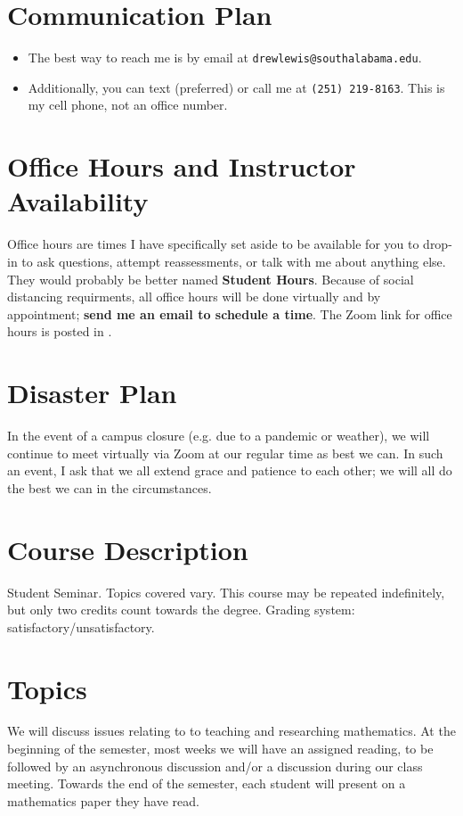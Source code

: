 \documentclass{article}
\begin{document}
\section*{\fontsize{12}{15}\selectfont Communication Plan}

\begin{itemize}
\item The best way to reach me is by email at {\tt drewlewis@southalabama.edu}. 
\item Additionally, you can text (preferred) or call me at {\tt(251) 219-8163}. This is my cell phone, not an office number.
\end{itemize}

\section*{\fontsize{12}{15}\selectfont Office Hours and Instructor Availability}

Office hours are times I have specifically set aside to be available for you to drop-in to ask questions, attempt reassessments, or talk with me about anything else. They would probably be better named \textbf{Student Hours}. Because of social distancing requirments, all office hours will be done virtually and by appointment; {\bf send me an email to schedule a time}. The Zoom link for office hours is posted in \LMS.

\section*{\fontsize{12}{15}\selectfont Disaster Plan}
In the event of a campus closure (e.g. due to a pandemic or weather), we will continue to meet virtually via Zoom at our regular time as best we can. In such an event, I ask that we all extend grace and patience to each other; we will all do the best we can in the circumstances.


\section*{\fontsize{12}{15}\selectfont Course Description}
Student Seminar. Topics covered vary. This course may be repeated indefinitely, but only two credits count towards the degree. Grading system: satisfactory/unsatisfactory.


\section*{\fontsize{12}{15}\selectfont Topics}
We will discuss issues relating to to teaching and researching mathematics. At the beginning of the semester, most weeks we will have an assigned reading, to be followed by an asynchronous discussion and/or a discussion during our class meeting. Towards the end of the semester, each student will present on a mathematics paper they have read.
\end{document}
